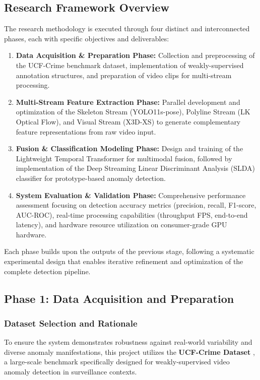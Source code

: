 \documentclass[12pt]{article}
\begin{document}
\subsection{Research Framework Overview}
The research methodology is executed through four distinct and interconnected phases, each with specific objectives and deliverables:

\begin{enumerate}
    \item \textbf{Data Acquisition \& Preparation Phase:} Collection and preprocessing of the UCF-Crime benchmark dataset, implementation of weakly-supervised annotation structures, and preparation of video clips for multi-stream processing.
    
    \item \textbf{Multi-Stream Feature Extraction Phase:} Parallel development and optimization of the Skeleton Stream (YOLO11s-pose), Polyline Stream (LK Optical Flow), and Visual Stream (X3D-XS) to generate complementary feature representations from raw video input.
    
    \item \textbf{Fusion \& Classification Modeling Phase:} Design and training of the Lightweight Temporal Transformer for multimodal fusion, followed by implementation of the Deep Streaming Linear Discriminant Analysis (SLDA) classifier for prototype-based anomaly detection.
    
    \item \textbf{System Evaluation \& Validation Phase:} Comprehensive performance assessment focusing on detection accuracy metrics (precision, recall, F1-score, AUC-ROC), real-time processing capabilities (throughput FPS, end-to-end latency), and hardware resource utilization on consumer-grade GPU hardware.
\end{enumerate}

Each phase builds upon the outputs of the previous stage, following a systematic experimental design that enables iterative refinement and optimization of the complete detection pipeline.

\subsection{Phase 1: Data Acquisition and Preparation}

\subsubsection{Dataset Selection and Rationale}
To ensure the system demonstrates robustness against real-world variability and diverse anomaly manifestations, this project utilizes the \textbf{UCF-Crime Dataset} \citep{sultani2018real}, a large-scale benchmark specifically designed for weakly-supervised video anomaly detection in surveillance contexts.
\end{document}
